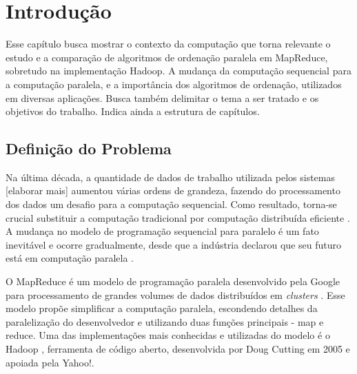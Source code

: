 \chapter{Introdução}
\label{cap:introducao}


Esse capítulo busca mostrar o contexto da computação que torna relevante o estudo e a comparação de algoritmos de ordenação paralela em MapReduce, sobretudo na implementação Hadoop. A mudança da computação sequencial para a computação paralela, e a importância dos algoritmos de ordenação, utilizados em diversas aplicações. Busca também delimitar o tema a ser tratado e os objetivos do trabalho. Indica ainda a estrutura de capítulos.  


%


\section{Definição do Problema}

%
%

Na última década, a quantidade de dados de trabalho utilizada pelos sistemas [elaborar mais] aumentou várias ordens de grandeza, fazendo do processamento dos dados um desafio para a computação sequencial. Como resultado, torna-se crucial substituir a computação tradicional por computação distribuída eficiente \cite{Lin:2010}. A mudança no modelo de programação sequencial para paralelo é um fato inevitável e ocorre gradualmente, desde que a indústria declarou que seu futuro está em computação paralela \cite{Asanovic:2009}. 

O MapReduce é um modelo de programação paralela desenvolvido pela Google para processamento de grandes volumes de dados distribuídos em \textit{clusters} \cite{Dean:2008}. Esse modelo propõe simplificar a computação paralela, escondendo detalhes da paralelização do desenvolvedor e utilizando duas funções principais - map e reduce.
Uma das implementações mais conhecidas e utilizadas do modelo é o Hadoop \cite{Hadoop:2010}, ferramenta de código aberto, desenvolvida por Doug Cutting em 2005 e apoiada pela Yahoo!. 

